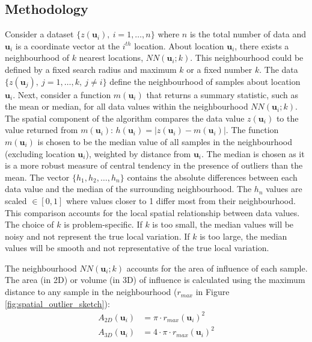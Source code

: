 \subsection{Methodology}
\label{subsec:02methodology}


Consider a dataset $\{z(\mathbf{u}_{i}), \ i = 1, \dots, n\}$ where $n$ is the total number of data and $\mathbf{u}_{i}$ is a coordinate vector at the $i^{th}$ location. About location $\mathbf{u}_{i}$, there exists a neighbourhood of $k$ nearest locations, $NN(\mathbf{u}_{i}; k)$. This neighbourhood could be defined by a fixed search radius and maximum $k$ or a fixed number $k$. The data $\{z(\mathbf{u}_{j}), \ j = 1, \dots, k, \ j \neq i \}$ define the neighbourhood of samples about location $\mathbf{u}_{i}$. Next, consider a function $m(\mathbf{u}_{i})$ that returns a summary statistic, such as the mean or median, for all data values within the neighbourhood $NN(\mathbf{u}_{i}; k)$. The spatial component of the algorithm compares the data value $z(\mathbf{u}_{i})$ to the value returned from $m(\mathbf{u}_{i})$: $h(\mathbf{u}_{i}) = |z(\mathbf{u}_{i}) - m(\mathbf{u}_{i})|$. The function $m(\mathbf{u}_{i})$ is chosen to be the median value of all samples in the neighbourhood (excluding location $\mathbf{u}_{i}$), weighted by distance from $\mathbf{u}_{i}$. The median is chosen as it is a more robust measure of central tendency in the presence of outliers than the mean. The vector $\{h_{1}, h_{2}, \dots, h_{n}\}$ contains the absolute differences between each data value and the median of the surrounding neighbourhood. The $h_{n}$ values are scaled $\in [0,1]$ where values closer to 1 differ most from their neighbourhood. This comparison accounts for the local spatial relationship between data values. The choice of $k$ is problem-specific. If $k$ is too small, the median values will be noisy and not represent the true local variation. If $k$ is too large, the median values will be smooth and not representative of the true local variation.

The neighbourhood $NN(\mathbf{u}_{i}; k)$ accounts for the area of influence of each sample. The area (in \acrshort{2D}) or volume (in \acrshort{3D}) of influence is calculated using the maximum distance to any sample in the neighbourhood ($r_{max}$ in Figure \ref{fig:spatial_outlier_sketch}):
\begin{align}
    A_{2D}(\mathbf{u}_{i}) & = \pi \cdot r_{max}(\mathbf{u}_{i})^{2}         \\
    A_{3D}(\mathbf{u}_{i}) & = 4 \cdot \pi \cdot r_{max}(\mathbf{u}_{i})^{2}
    \label{eq:aoi}
\end{align}

